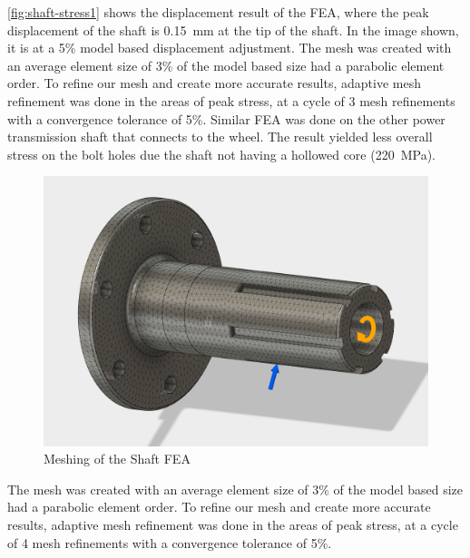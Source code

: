 \documentclass[main.tex]{subfiles}
\begin{document}
\ref{fig:shaft-stress1} shows the displacement result of the FEA, where the peak displacement of the shaft is \SI{0.15}{mm} at the tip of the shaft. In the image shown, it is at a 5\% model based displacement adjustment. The mesh was created with an average element size of 3\% of the model based size had a parabolic element order. To refine our mesh and create more accurate results, adaptive mesh refinement was done in the areas of peak stress, at a cycle of 3 mesh refinements with a convergence tolerance of 5\%. Similar FEA was done on the other power transmission shaft that connects to the wheel. The result yielded less overall stress on the bolt holes due the shaft not having a hollowed core (\SI{220}{MPa}).\\

    \begin{figure}[H]
        \centering
        \includegraphics[width=\linewidth]{images/fig15}
        \caption{Meshing of the Shaft FEA}
    \end{figure}
    The mesh was created with an average element size of 3\%  of the model based size had a parabolic element order. To refine our mesh and create more accurate results, adaptive mesh refinement was done in the areas of peak stress, at a cycle of 4 mesh refinements with a convergence tolerance of 5\%.
\end{document}
